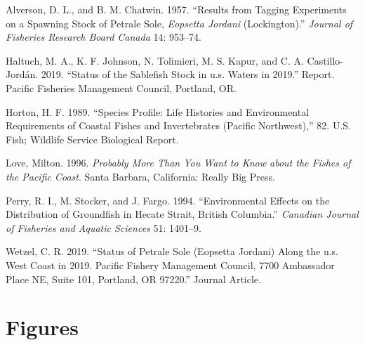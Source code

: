 \documentclass[
]{scrartcl}
\newlength{\cslhangindent}
\newenvironment{CSLReferences}[2] %
 {\begin{list}{}{%
  \setlength{\itemindent}{0pt}
  \setlength{\leftmargin}{0pt}
  \setlength{\parsep}{0pt}
  \ifodd #1
   \setlength{\leftmargin}{\cslhangindent}
   \setlength{\itemindent}{-1\cslhangindent}
  \fi
  \setlength{\itemsep}{#2\baselineskip}}}
 {\end{list}}
\begin{document}
\label{refs}
\begin{CSLReferences}{1}{0}
Alverson, D. L., and B. M. Chatwin. 1957. {``Results from Tagging
Experiments on a Spawning Stock of Petrale Sole, \emph{{Eopsetta}
Jordani} ({Lockington}).''} \emph{Journal of Fisheries Research Board
Canada} 14: 953--74.

Haltuch, M. A., K. F. Johnson, N. Tolimieri, M. S. Kapur, and C. A.
Castillo-Jordán. 2019. {``Status of the Sablefish Stock in u.s. Waters
in 2019.''} Report. Pacific Fisheries Management Council, Portland, OR.

Horton, H. F. 1989. {``Species Profile: Life Histories and Environmental
Requirements of Coastal Fishes and Invertebrates ({Pacific}
{Northwest}),''} 82. U.S. Fish; Wildlife Service Biological Report.

Love, Milton. 1996. \emph{Probably More Than You Want to Know about the
Fishes of the {Pacific} {Coast}}. Santa Barbara, California: Really Big
Press.

Perry, R. I., M. Stocker, and J. Fargo. 1994. {``Environmental Effects
on the Distribution of Groundfish in {Hecate} {Strait}, {British}
{Columbia}.''} \emph{Canadian Journal of Fisheries and Aquatic Sciences}
51: 1401--9.

Wetzel, C. R. 2019. {``Status of Petrale Sole (Eopsetta Jordani) Along
the u.s. West Coast in 2019. Pacific Fishery Management Council, 7700
Ambassador Place NE, Suite 101, Portland, OR 97220.''} Journal Article.

\end{CSLReferences}

\section{Figures}\label{figures}
\end{document}

